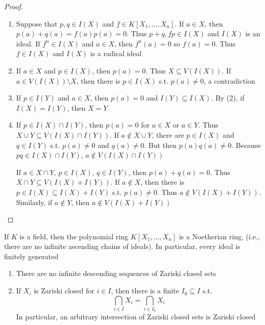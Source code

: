 \documentclass[11pt]{article}
\begin{document}
\begin{proof}
\begin{enumerate}
\item Suppose that \(p,q\in I(X)\) and \(f\in K[X_1,\dots,X_n]\). If
\(a\in X\), then \(p(a)+q(a)=f(a)p(a)=0\). Thus \(p+q,fp\in I(X)\) and
\(I(X)\) is an ideal. If \(f^n\in I(X)\) and \(a\in X\), then
\(f^n(a)=0\) so \(f(a)=0\). Thus \(f\in I(X)\) and \(I(X)\) is a radical ideal
\item If \(a\in X\) and \(p\in I(X)\), then \(p(a)=0\). Thus
\(X\subseteq V(I(X))\). If \(a\in V(I(X))\setminus X\), then there is
\(p\in I(X)\) s.t. \(p(a)\neq0\), a contradiction
\item If \(p\in I(Y)\) and \(a\in X\), then \(p(a)=0\) and \(I(Y)\subseteq
       I(X)\). By (2), if \(I(X)=I(Y)\), then \(X=Y\)
\item If \(p\in I(X)\cap I(Y)\), then \(p(a)=0\) for \(a\in X\) or \(a\in Y\).
Thus \(X\cup Y\subseteq V(I(X)\cap I(Y))\). If \(a\not \in X\cup Y\),
there are \(p\in I(X)\) and \(q\in I(Y)\) s.t. \(p(a)\neq0\) and
\(q(a)\neq0\). But then \(p(a)q(a)\neq0\). Because \(pq\in I(X)\cap
       I(Y)\), \(a\not\in V(I(X)\cap I(Y))\)

If \(a\in X\cap Y\), \(p\in I(X)\), \(q\in I(Y)\), then \(p(a)+q(a)=0\).
Thus \(X\cap Y\subseteq V(I(X)+I(Y))\). If \(a\not\in X\), then there is
\(p\in I(X)\subseteq I(X)+I(Y)\) s.t. \(p(a)\neq0\). Thus \(a\not\in
       V(I(X)+I(Y))\). Similarly, if \(a\not\in Y\), then \(a\not\in V(I(X)+I(Y))\)
\end{enumerate}
\end{proof}

\begin{theorem}
If \(K\) is a field, then the polynomial ring \(K[X_1,\dots,X_n]\) is a
Noetherian ring, (i.e., there are no infinite ascending chains of ideals).
In particular, every ideal is finitely generated
\end{theorem}

\begin{corollary}[]
\begin{enumerate}
\item There are no infinite descending sequences of Zariski closed sets
\item If \(X_i\) is Zariski closed for \(i\in I\), then there is a finite
\(I_0\subseteq I\) s.t.
\begin{equation*}
\bigcap_{i\in I}X_i=\bigcap_{i\in I_0}X_i
\end{equation*}
In particular, an arbitrary intersection of Zariski closed sets is
Zariski closed
\end{enumerate}
\end{corollary}
\end{document}
